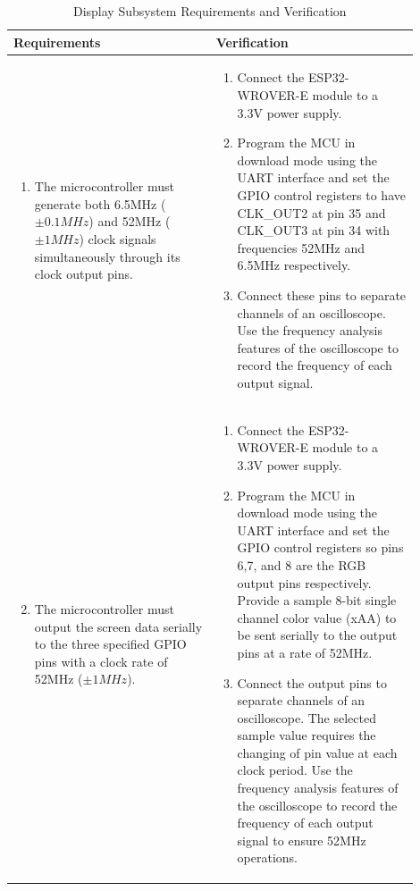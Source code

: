 \documentclass[12pt]{article}
\begin{document}
\begin{table}[!h]
	\caption{Display Subsystem Requirements and Verification}
	\label{tab:display_rv}
	\centering
	\begin{tabular}{| p{0.45\linewidth} | p{0.45\linewidth} |} 
 		\hline
 		\textbf{Requirements} & \textbf{Verification} \\ 
 		\hline
 		\begin{enumerate}
 			\item The microcontroller must generate both 6.5MHz ($\pm 0.1MHz$) and 52MHz ($\pm 1MHz$) clock signals simultaneously through its clock output pins.
		\end{enumerate} & \begin{enumerate}[label=\alph*)]
 			\item Connect the ESP32-WROVER-E module to a 3.3V power supply. 
 			\item Program the MCU in download mode using the UART interface and set the GPIO control registers to have CLK\_OUT2 at pin 35 and CLK\_OUT3 at pin 34 with frequencies 52MHz and 6.5MHz respectively. 
 			\item Connect these pins to separate channels of an oscilloscope. Use the frequency analysis features of the oscilloscope to record the frequency of each output signal.
		\end{enumerate} \\
		\hline
		\begin{enumerate}
		\setcounter{enumi}{1}
 			\item The microcontroller must output the screen data serially to the three specified GPIO pins with a clock rate of 52MHz ($\pm 1MHz$).
		\end{enumerate} & \begin{enumerate}[label=\alph*)]
 			\item Connect the ESP32-WROVER-E module to a 3.3V power supply.
 			\item Program the MCU in download mode using the UART interface and set the GPIO control registers so pins 6,7, and 8 are the RGB output pins respectively. Provide a sample 8-bit single channel color value (xAA) to be sent serially to the output pins at a rate of 52MHz.
 			\item Connect the output pins to separate channels of an oscilloscope. The selected sample value requires the changing of pin value at each clock period. Use the frequency analysis features of the oscilloscope to record the frequency of each output signal to ensure 52MHz operations.
		\end{enumerate} \\
		\hline
	\end{tabular}
\end{table}
\end{document}
